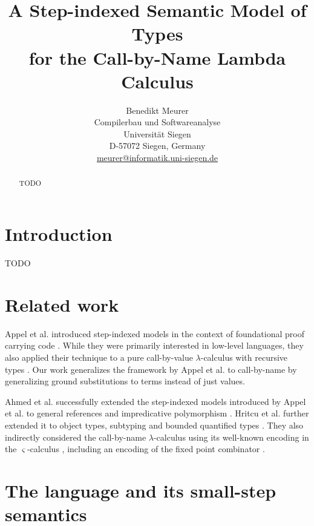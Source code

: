 \documentclass[12pt,a4paper,draft]{article}
\theoremstyle{definition}
\theoremstyle{plain}
\begin{document}
\author{%
  Benedikt Meurer\\
  Compilerbau und Softwareanalyse\\
  Universit\"at Siegen\\
  D-57072 Siegen, Germany\\
  \url{meurer@informatik.uni-siegen.de}
}
\date{}
\title{A Step-indexed Semantic Model of Types\\for the Call-by-Name Lambda Calculus}
\maketitle

\begin{abstract}
  TODO
\end{abstract}


\section{Introduction}
\label{sec:Introduction}


TODO


\section{Related work}
\label{sec:Related_work}


Appel et al. introduced step-indexed models in the context of foundational proof carrying code \cite{Appel00}.
While they were primarily interested in low-level languages, they also applied their technique to a pure
call-by-value $\lambda$-calculus with recursive types \cite{Appel01}. Our work generalizes the framework
by Appel et al. to call-by-name by generalizing ground substitutions to terms instead of just values.

Ahmed et al. successfully extended the step-indexed models introduced by Appel et al. to general references
and impredicative polymorphism \cite{Ahmed04,Ahmed02}. Hritcu et al. further extended it to object types,
subtyping and bounded quantified types \cite{Hritcu07,Hritcu09}. They also indirectly considered the
call-by-name $\lambda$-calculus using its well-known encoding in the $\varsigma$-calculus \cite{AbadiCardelli96},
including an encoding of the fixed point combinator \cite{Fisher94}.


\section{The language and its small-step semantics}
\label{sec:The_language_and_its_small_step_semantics}
\end{document}
